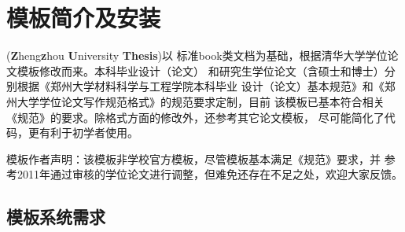 \chapter{模板简介及安装}
\label{cha:introduction}

\zzuthesis(\textbf{Z}heng\textbf{z}hou \textbf{U}niversity \textbf{Thesis})以
标准book类文档为基础，根据清华大学学位论文模板修改而来。本科毕业设计（论文）
和研究生学位论文（含硕士和博士）分别根据《郑州大学材料科学与工程学院本科毕业
设计（论文）基本规范》和《郑州大学学位论文写作规范格式》的规范要求定制，目前
该模板已基本符合相关《规范》的要求。除格式方面的修改外，还参考其它论文模板，
尽可能简化了代码，更有利于初学者使用。

\textsf{模板作者声明：}该模板非学校官方模板，尽管模板基本满足《规范》要求，并
参考2011年通过审核的学位论文进行调整，但难免还存在不足之处，欢迎大家反馈。

% 
% 
% 
  
\section{模板系统需求}
\label{sec:requirements}

